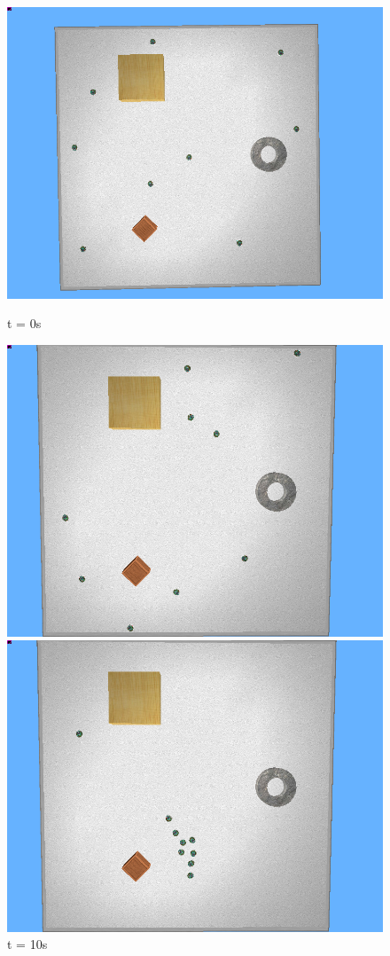 \begin{figure}[!h]
	\centering
	\begin{minipage}{.5\textwidth}
		\centering
		\includegraphics[width=.75\linewidth]{swarm_test_1}
		\caption*{t = 0s}
		\label{fig:sw1}
	\end{minipage}%
	\begin{minipage}{.5\textwidth}
		\centering
		\includegraphics[width=.75\linewidth]{swarm_test_2}
		\caption*{t = 10s}
		\label{fig:sw2}
	\end{minipage}
	\begin{minipage}{.5\textwidth}
		\centering
		\includegraphics[width=.75\linewidth]{swarm_test_3}

\end{minipage}
\end{figure}

